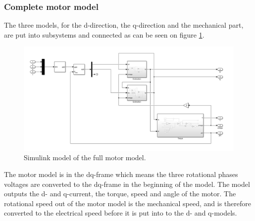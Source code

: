 \subsubsection{Complete motor model}
The three models, for the d-direction, the q-direction and the mechanical part, are put into subsystems and connected as can be seen on figure \ref{fig:motor}.

\begin{figure}[H]
	\centering
	\includegraphics[width=1\linewidth]{pictures/control/motor_model.PNG}
	\caption{Simulink model of the full motor model.}
	\label{fig:motor}
\end{figure}

The motor model is in the dq-frame which means the three rotational phases voltages are converted to the dq-frame in the beginning of the model. The model outputs the d- and q-current, the torque, speed and angle of the motor. The rotational speed out of the motor model is the mechanical speed, and is therefore converted to the electrical speed before it is put into to the d- and q-models. 